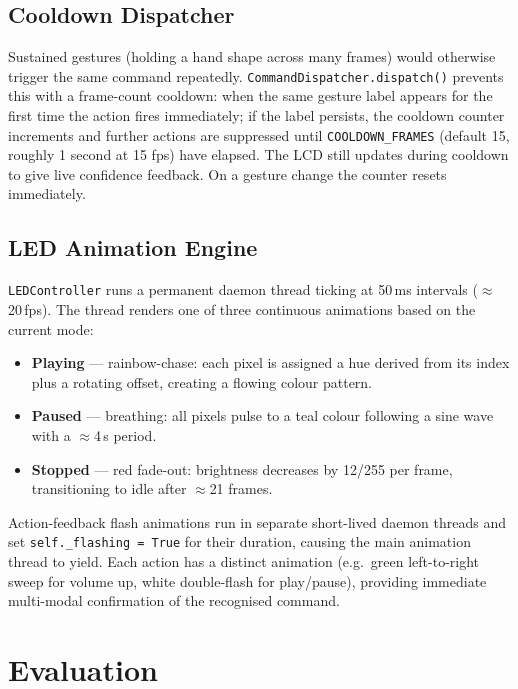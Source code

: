 \documentclass[sigconf, nonacm]{acmart}
\begin{document}
\subsection{Cooldown Dispatcher}

Sustained gestures (holding a hand shape across many frames) would otherwise trigger the same command repeatedly. \texttt{CommandDispatcher.dispatch()} prevents this with a frame-count cooldown: when the same gesture label appears for the first time the action fires immediately; if the label persists, the cooldown counter increments and further actions are suppressed until \texttt{COOLDOWN\_FRAMES} (default 15, roughly 1 second at 15 fps) have elapsed. The LCD still updates during cooldown to give live confidence feedback. On a gesture change the counter resets immediately.

\subsection{LED Animation Engine}

\texttt{LEDController} runs a permanent daemon thread ticking at 50\,ms intervals ($\approx$20\,fps). The thread renders one of three continuous animations based on the current mode:

\begin{itemize}
  \item \textbf{Playing} — rainbow-chase: each pixel is assigned a hue derived from its index plus a rotating offset, creating a flowing colour pattern.
  \item \textbf{Paused} — breathing: all pixels pulse to a teal colour following a sine wave with a $\approx$4\,s period.
  \item \textbf{Stopped} — red fade-out: brightness decreases by 12/255 per frame, transitioning to idle after $\approx$21 frames.
\end{itemize}

Action-feedback flash animations run in separate short-lived daemon threads and set \texttt{self.\_flashing = True} for their duration, causing the main animation thread to yield. Each action has a distinct animation (e.g.\ green left-to-right sweep for volume up, white double-flash for play/pause), providing immediate multi-modal confirmation of the recognised command.

\section{Evaluation}
\end{document}
